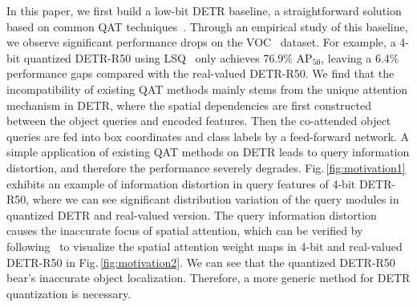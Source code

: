 \documentclass[10pt,twocolumn,letterpaper]{article}
\begin{document}
In this paper, we first build a low-bit DETR baseline, a straightforward solution based on common QAT techniques~\cite{bhalgat2020lsq}. Through an empirical study of this baseline, we observe significant performance drops on the VOC~\cite{voc2007} dataset. For example, a 4-bit quantized DETR-R50 using LSQ~\cite{esser2019learned} only achieves 76.9\% AP$_{50}$, leaving a 6.4\% performance gaps compared with the real-valued DETR-R50. 
%
%
We find that the incompatibility of existing QAT methods mainly stems from the unique attention mechanism in DETR, where the spatial dependencies are first constructed between the object queries and encoded features. Then the co-attended object queries are fed into box coordinates and class labels by a feed-forward network. A simple application of existing QAT methods on DETR leads to query information distortion, and therefore the performance severely degrades.
%
%
Fig.\,\ref{fig:motivation1} exhibits an example of information distortion in query features of 4-bit DETR-R50, where we can see significant distribution variation of the query modules in quantized DETR and real-valued version.
% 
%
%
The query information distortion causes the inaccurate focus of spatial attention, which can be verified by following~\cite{meng2021conditional} to visualize the spatial attention weight maps in 4-bit and real-valued DETR-R50 in Fig.\,\ref{fig:motivation2}. We can see that the quantized DETR-R50 bear's inaccurate object localization. Therefore, a more generic method for DETR quantization is necessary.




\end{document}
